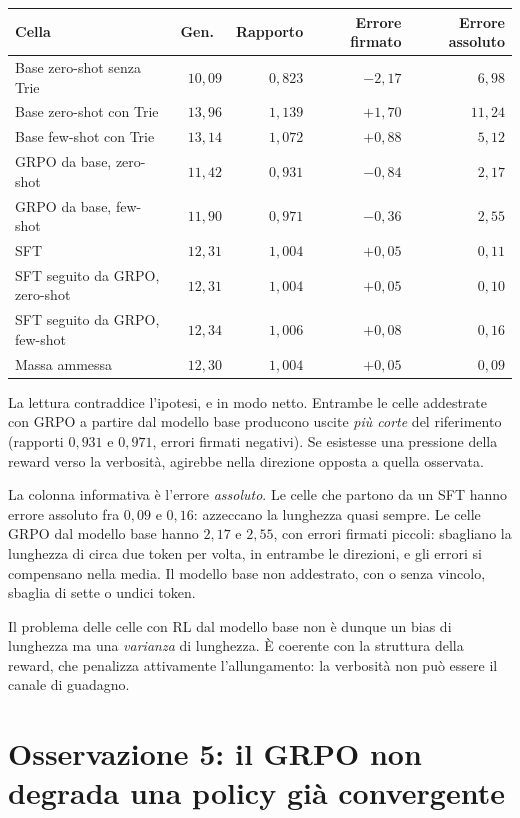 \begin{center}
\begin{tabular}{lrrrr}
\toprule
Cella & Gen.\ & Rapporto & Errore firmato & Errore assoluto \\
\midrule
Base zero-shot senza Trie & $10{,}09$ & $0{,}823$ & $-2{,}17$ & $6{,}98$ \\
Base zero-shot con Trie & $13{,}96$ & $1{,}139$ & $+1{,}70$ & $11{,}24$ \\
Base few-shot con Trie & $13{,}14$ & $1{,}072$ & $+0{,}88$ & $5{,}12$ \\
GRPO da base, zero-shot & $11{,}42$ & $0{,}931$ & $-0{,}84$ & $2{,}17$ \\
GRPO da base, few-shot & $11{,}90$ & $0{,}971$ & $-0{,}36$ & $2{,}55$ \\
SFT & $12{,}31$ & $1{,}004$ & $+0{,}05$ & $0{,}11$ \\
SFT seguito da GRPO, zero-shot & $12{,}31$ & $1{,}004$ & $+0{,}05$ & $0{,}10$ \\
SFT seguito da GRPO, few-shot & $12{,}34$ & $1{,}006$ & $+0{,}08$ & $0{,}16$ \\
Massa ammessa & $12{,}30$ & $1{,}004$ & $+0{,}05$ & $0{,}09$ \\
\bottomrule
\end{tabular}
\end{center}

La lettura contraddice l'ipotesi, e in modo netto. Entrambe le celle addestrate
con GRPO a partire dal modello base producono uscite \emph{più corte} del
riferimento (rapporti $0{,}931$ e $0{,}971$, errori firmati negativi). Se
esistesse una pressione della reward verso la verbosità, agirebbe nella
direzione opposta a quella osservata.

La colonna informativa è l'errore \emph{assoluto}. Le celle che partono da un
SFT hanno errore assoluto fra $0{,}09$ e $0{,}16$: azzeccano la lunghezza quasi
sempre. Le celle GRPO dal modello base hanno $2{,}17$ e $2{,}55$, con errori
firmati piccoli: sbagliano la lunghezza di circa due token per volta, in
entrambe le direzioni, e gli errori si compensano nella media. Il modello base
non addestrato, con o senza vincolo, sbaglia di sette o undici token.

Il problema delle celle con RL dal modello base non è dunque un bias di
lunghezza ma una \emph{varianza} di lunghezza. È coerente con la struttura della
reward, che penalizza attivamente l'allungamento: la verbosità non può essere il
canale di guadagno.

\section{Osservazione 5: il GRPO non degrada una policy già convergente}
\label{sec:osservazione5}

